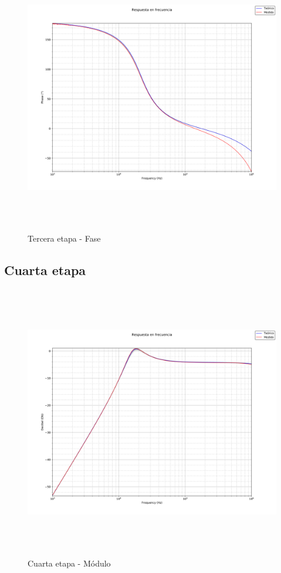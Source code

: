  \begin{figure}[H] %
	\centering
	\includegraphics[width=12cm,height=12cm,keepaspectratio]{../Imagenes/THIRD_PHA.png}
	\caption{Tercera etapa - Fase}
	\label{3P}
\end{figure}


\subsection{Cuarta etapa}

 \begin{figure}[H] %
	\centering
	\includegraphics[width=12cm,height=12cm,keepaspectratio]{../Imagenes/FOURTH_MOD.png}
	\caption{Cuarta etapa - M\'odulo}
	\label{fourthmod}
\end{figure}

